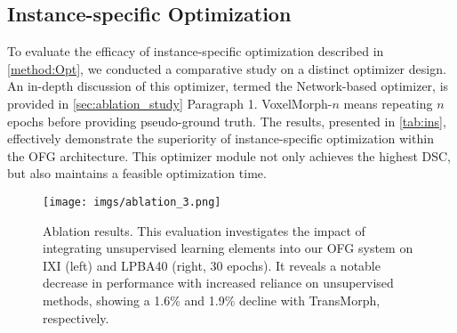 \documentclass[10pt,twocolumn,letterpaper]{article}
\begin{document}
\subsection{Instance-specific Optimization}
To evaluate the efficacy of instance-specific optimization described in \cref{method:Opt}, we conducted a comparative study on a distinct optimizer design. An in-depth discussion of this optimizer, termed the Network-based optimizer, is provided in \cref{sec:ablation_study} Paragraph 1. VoxelMorph-$n$ means repeating $n$ epochs before providing pseudo-ground truth. The results, presented in \cref{tab:ins}, effectively demonstrate the superiority of instance-specific optimization within the OFG architecture. This optimizer module not only achieves the highest DSC, but also maintains a feasible optimization time.




\begin{figure}[t]
    \begin{center}
       \texttt{[image: imgs/ablation\_3.png]}
    \end{center}
    \caption{Ablation results. This evaluation investigates the impact of integrating unsupervised learning elements into our OFG system on IXI (left) and LPBA40 (right, 30 epochs). It reveals a notable decrease in performance with increased reliance on unsupervised methods, showing a 1.6\% and 1.9\% decline with TransMorph, respectively.}
    \label{fig:mix}
\end{figure}
\end{document}
